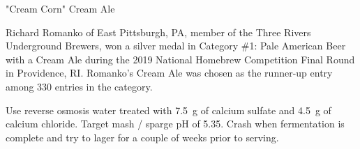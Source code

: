 \stylesection{\stylecreamale}

\begin{recipie}{"Cream Corn" Cream Ale}

\begin{aboutblock}
Richard Romanko of East Pittsburgh, PA, member of the Three Rivers Underground Brewers,
won a silver medal in Category \#1: Pale American Beer with a Cream Ale during the 2019
National Homebrew Competition Final Round in Providence, RI. Romanko's Cream Ale was
chosen as the runner-up entry among 330 entries in the category. 
\end{aboutblock}
 

\begin{methodandtiming}
 
\begin{mashsteps}
\end{mashsteps}

\begin{directions}
Use reverse osmosis water treated with 7.5~g of calcium sulfate and 4.5~g of calcium
chloride. Target mash / sparge pH of 5.35. Crash when fermentation is complete and
try to lager for a couple of weeks prior to serving.
\end{directions}

\end{methodandtiming}

\pagebreak

\begin{ingredientsblock}

\begin{malts}
\end{malts}

\begin{hops}
\end{hops}

\begin{yeasts}
\end{yeasts}

\end{ingredientsblock}

\end{recipie}
